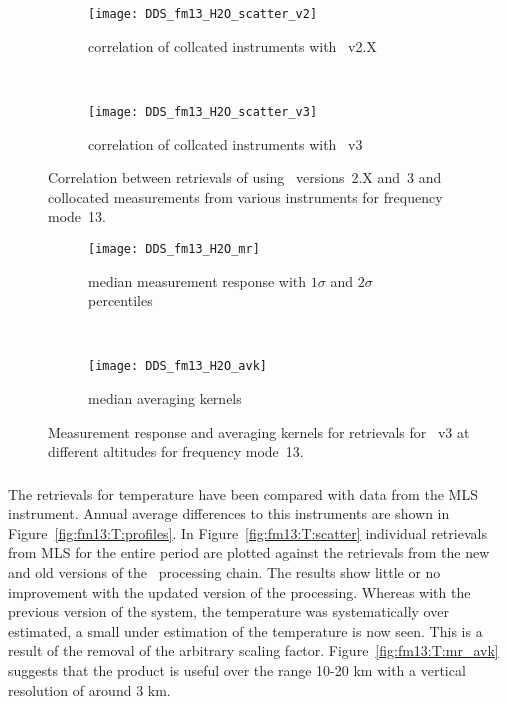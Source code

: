 \begin{figure}[htpb]
    \centering
    \begin{subfigure}[b]{0.49\textwidth}
        \texttt{[image: DDS\_fm13\_H2O\_scatter\_v2]}
        \caption{correlation of collcated instruments with \smr~v2.X}
        \label{fig:fm13:H2O:scatter:v2}
    \end{subfigure}
    \,
    \begin{subfigure}[b]{0.49\textwidth}
        \texttt{[image: DDS\_fm13\_H2O\_scatter\_v3]}
        \caption{correlation of collcated instruments with \smr~v3}
        \label{fig:fm13:H2O:scatter:v3}
    \end{subfigure}
    \caption{Correlation between retrievals of  using \smr\
    versions~2.X and~3 and collocated measurements from various instruments
    for frequency mode~13.}
    \label{fig:fm13:H2O:scatter}
\end{figure}

\begin{figure}[htpb]
    \centering
    \begin{subfigure}[b]{0.49\textwidth}
        \texttt{[image: DDS\_fm13\_H2O\_mr]}
        \caption{median measurement response with $1\sigma$ and $2\sigma$
        percentiles}
        \label{fig:fm13:H2O:mr}
    \end{subfigure}
    \,
    \begin{subfigure}[b]{0.49\textwidth}
        \texttt{[image: DDS\_fm13\_H2O\_avk]}
        \caption{median averaging kernels\newline~}
        \label{fig:fm13:H2O:avk}
    \end{subfigure}
    \caption{Measurement response and averaging kernels for 
    retrievals for \smr~v3 at different altitudes for frequency mode~13.}
    \label{fig:fm13:H2O:mr_avk}
\end{figure}



\subsubsection{}
\label{sec:fm13:comparison:temperature}
The retrievals for temperature have been compared with data from the MLS
instrument. Annual average differences to this instruments are shown in
Figure~\ref{fig:fm13:T:profiles}. In Figure~\ref{fig:fm13:T:scatter} individual
retrievals from MLS for the entire period are plotted against the retrievals
from the new and old versions of the \smr\ processing chain. The results show
little or no improvement with the updated version of the processing. Whereas
with the previous version of the system, the temperature was systematically
over estimated, a small under estimation of the temperature is now seen. This is a result of the removal of the arbitrary scaling factor.
Figure~\ref{fig:fm13:T:mr_avk} suggests that the product is useful over the range 10-20 km with a vertical resolution of around 3 km. 

